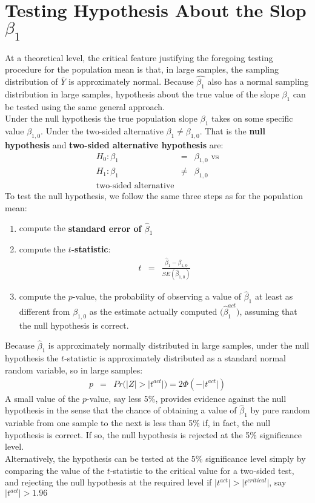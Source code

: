 \section{Testing Hypothesis About the Slop \texorpdfstring{$\beta_{1}$}{Beta}}
At a theoretical level, the critical feature justifying the foregoing testing procedure for the population mean is that, in large samples, the sampling distribution of $\bar{Y}$ is approximately normal. Because $\hat{\beta_{1}}$ also has a normal sampling distribution in large samples, hypothesis about the true value of the slope $\beta_{1}$ can be tested using the same general approach.\\
Under the null hypothesis the true population slope $\beta_{1}$ takes on some specific value $\beta_{1, 0}$. Under the two-sided alternative $\beta_{1} \neq \beta_{1, 0}$. That is the \textbf{\color{ForestGreen}null hypothesis} and \textbf{\color{ForestGreen}two-sided alternative hypothesis} are:
\begin{eqnarray}
	H_{0}: \beta_{1} &=& \beta_{1, 0}\text{ vs}\\
	H_{1}: \beta_{1} &\neq& \beta_{1, 0}\\
	\text{two-sided alternative}
\end{eqnarray}
To test the null hypothesis, we follow the same three steps as for the population mean:
\begin{enumerate}
	\item compute the \textbf{\color{ForestGreen}standard error of $\hat{\beta}_{1}$}
	\item compute the \textbf{\color{ForestGreen}$t$-statistic}:
	\begin{eqnarray}
		t &=& \frac{\hat{\beta}_{1} - \beta_{1, 0}}{SE(\hat{\beta}_{1, 0})}
	\end{eqnarray}
	\item compute the $p$-value, the probability of observing a value of $\hat{\beta}_{1}$ at least as different from $\beta_{1, 0}$ as the estimate actually computed $\big(\hat{\beta}_{1}^{act}\big)$, assuming that the null hypothesis is correct.
\end{enumerate}
Because $\hat{\beta}_{1}$ is approximately normally distributed in large samples, under the null hypothesis the $t$-statistic is approximately distributed as a standard normal random variable, so in large samples:
\begin{eqnarray}
	p &=& Pr\big(\bigr\rvert Z\bigr\rvert > \bigr\rvert t^{act}\bigr\rvert\big) = 2\Phi(-\bigr\rvert t^{act}\bigr\rvert)
\end{eqnarray}
A small value of the $p$-value, say less 5\%, provides evidence against the null hypothesis in the sense that the chance of obtaining a value of $\hat{\beta}_{1}$ by pure random variable from one sample to the next is less than 5\% if, in fact, the null hypothesis is correct. If so, the null hypothesis is rejected at the 5\% significance level.\\
Alternatively, the hypothesis can be tested at the 5\% significance level simply by comparing the value of the $t$-statistic to the critical value for a two-sided test, and rejecting the null hypothesis at the required level if $\bigr\rvert t^{act}\bigr\rvert > \bigr\rvert t^{critical}\bigr\rvert$, say $\bigr\rvert t^{act}\bigr\rvert > 1.96$ 

